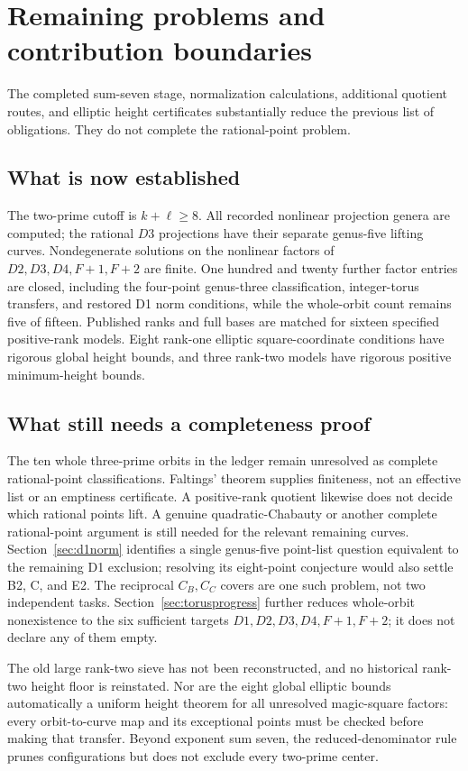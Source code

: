 \documentclass[11pt,letterpaper]{article}
\theoremstyle{definition}\newtheorem{definition}[theorem]{Definition}
\theoremstyle{remark}\newtheorem{remark}[theorem]{Remark}
\begin{document}
\section{Remaining problems and contribution boundaries}\label{sec:remaining}
The completed sum-seven stage, normalization calculations, additional quotient routes, and elliptic height certificates substantially reduce the previous list of obligations. They do not complete the rational-point problem.

\subsection{What is now established}
The two-prime cutoff is $k+\ell\ge8$. All recorded nonlinear projection genera are computed; the rational $D3$ projections have their separate genus-five lifting curves. Nondegenerate solutions on the nonlinear factors of $D2,D3,D4,F{+}1,F{+}2$ are finite. One hundred and twenty further factor entries are closed, including the four-point genus-three classification, integer-torus transfers, and restored D1 norm conditions, while the whole-orbit count remains five of fifteen. Published ranks and full bases are matched for sixteen specified positive-rank models. Eight rank-one elliptic square-coordinate conditions have rigorous global height bounds, and three rank-two models have rigorous positive minimum-height bounds.

\subsection{What still needs a completeness proof}
The ten whole three-prime orbits in the ledger remain unresolved as complete rational-point classifications. Faltings' theorem supplies finiteness, not an effective list or an emptiness certificate. A positive-rank quotient likewise does not decide which rational points lift. A genuine quadratic-Chabauty or another complete rational-point argument is still needed for the relevant remaining curves. Section~\ref{sec:d1norm} identifies a single genus-five point-list question equivalent to the remaining D1 exclusion; resolving its eight-point conjecture would also settle B2, C, and E2. The reciprocal $C_B,C_C$ covers are one such problem, not two independent tasks. Section~\ref{sec:torusprogress} further reduces whole-orbit nonexistence to the six sufficient targets $D1,D2,D3,D4,F{+}1,F{+}2$; it does not declare any of them empty.

The old large rank-two sieve has not been reconstructed, and no historical rank-two height floor is reinstated. Nor are the eight global elliptic bounds automatically a uniform height theorem for all unresolved magic-square factors: every orbit-to-curve map and its exceptional points must be checked before making that transfer. Beyond exponent sum seven, the reduced-denominator rule prunes configurations but does not exclude every two-prime center.
\end{document}
